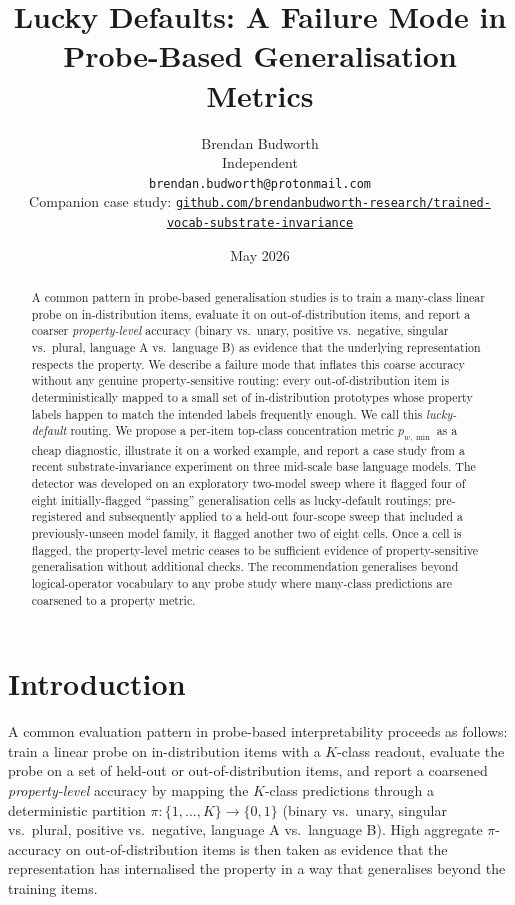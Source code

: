 \documentclass[11pt,letterpaper]{article}
\title{Lucky Defaults: A Failure Mode in\\Probe-Based Generalisation Metrics%
       \texorpdfstring{}{}}
\author{%
  Brendan Budworth\\
  Independent\\
  \texttt{brendan.budworth@protonmail.com}\\[2pt]
  {\footnotesize Companion case study:
   \href{https://github.com/brendanbudworth-research/trained-vocab-substrate-invariance}%
        {\nolinkurl{github.com/brendanbudworth-research/trained-vocab-substrate-invariance}}}%
}
\date{May 2026}
\newcommand{\pwmin}{\texorpdfstring{\ensuremath{p_{w,\min}}}{p\_(w,min)}}
\begin{document}
\maketitle

\begin{abstract}
\noindent
A common pattern in probe-based generalisation studies is to train a
many-class linear probe on in-distribution items, evaluate it on
out-of-distribution items, and report a coarser \emph{property-level}
accuracy (binary vs.\ unary, positive vs.\ negative, singular vs.\
plural, language A vs.\ language B) as evidence that the underlying
representation respects the property.  We describe a failure mode that
inflates this coarse accuracy without any genuine property-sensitive
routing: every out-of-distribution item is deterministically mapped to
a small set of in-distribution prototypes whose property labels happen
to match the intended labels frequently enough.  We call this
\emph{lucky-default} routing.  We propose a per-item top-class
concentration metric \pwmin{} as a cheap diagnostic, illustrate it
on a worked example, and report a case study from a recent
substrate-invariance experiment on three mid-scale base language
models. The detector was developed on an exploratory two-model
  sweep where it flagged four of eight initially-flagged ``passing''
  generalisation cells as lucky-default routings; pre-registered and
  subsequently applied to a held-out four-scope sweep that included
  a previously-unseen model family, it flagged another two of eight
  cells.  Once a cell is flagged, the property-level metric
  ceases to be sufficient evidence of property-sensitive
  generalisation without additional checks. The recommendation generalises beyond
logical-operator vocabulary to any probe study where many-class
predictions are coarsened to a property metric.
\end{abstract}

\section{Introduction}
\label{sec:intro}

A common evaluation pattern in probe-based interpretability proceeds
as follows: train a linear probe on in-distribution items with a
$K$-class readout, evaluate the probe on a set of held-out or
out-of-distribution items, and report a coarsened
\emph{property-level} accuracy by mapping the $K$-class predictions
through a deterministic partition $\pi: \{1,\ldots,K\} \to \{0,1\}$
(binary vs.\ unary, singular vs.\ plural, positive vs.\ negative,
language A vs.\ language B). High aggregate $\pi$-accuracy on
out-of-distribution items is then taken as evidence that the
representation has internalised the property in a way that
generalises beyond the training items.
\end{document}
